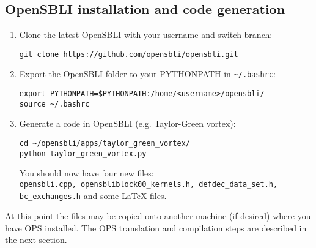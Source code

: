 \documentclass[11pt]{article}
\begin{document}
\subsection{OpenSBLI installation and code generation}\label{sec:opensbli}
\begin{enumerate}
\item{Clone the latest OpenSBLI with your username and switch branch:}
\begin{verbatim}
git clone https://github.com/opensbli/opensbli.git
\end{verbatim}

\item{Export the OpenSBLI folder to your PYTHONPATH in \verb|~/.bashrc|:}
\begin{verbatim}
export PYTHONPATH=$PYTHONPATH:/home/<username>/opensbli/
source ~/.bashrc
\end{verbatim}

\item{Generate a code in OpenSBLI (e.g. Taylor-Green vortex):}
\begin{verbatim}
cd ~/opensbli/apps/taylor_green_vortex/
python taylor_green_vortex.py
\end{verbatim}
You should now have four new files:\\ \verb|opensbli.cpp, opensbliblock00_kernels.h, defdec_data_set.h, bc_exchanges.h| and some LaTeX files.
\end{enumerate}
At this point the files may be copied onto another machine (if desired) where you have OPS installed. The OPS translation and compilation steps are described in the next section.
\end{document}
